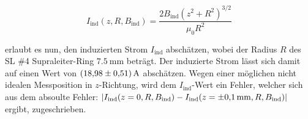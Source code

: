 \begin{equation*}
	I_{\text{ind}}(z,R,B_{\text{ind}}) = \frac{2B_{\text{ind}}(z^2+R^2)^{3/2}}{\mu_0R^2}
\label{AF6}
\end{equation*}

\noindent
erlaubt es nun, den induzierten Strom $I_{\text{ind}}$ abschätzen, wobei der
Radius $R$ des SL \#4 Supraleiter-Ring $\SI{7,5}{\milli\meter}$ beträgt. Der
induzierte Strom lässt sich damit auf einen Wert von $\SI{18.98\pm0.51}{\ampere}$
abschätzen. Wegen einer möglichen nicht idealen Messposition in $z$-Richtung,
wird dem $I_{\text{ind}}$-Wert ein Fehler, welcher sich aus dem absoulte Fehler:
$|I_{\text{ind}}(z=0,R,B_{\text{ind}}) - I_{\text{ind}}(z=\SI{\pm0.1}{\milli\meter},R,B_{\text{ind}})|$
ergibt, zugeschrieben.

